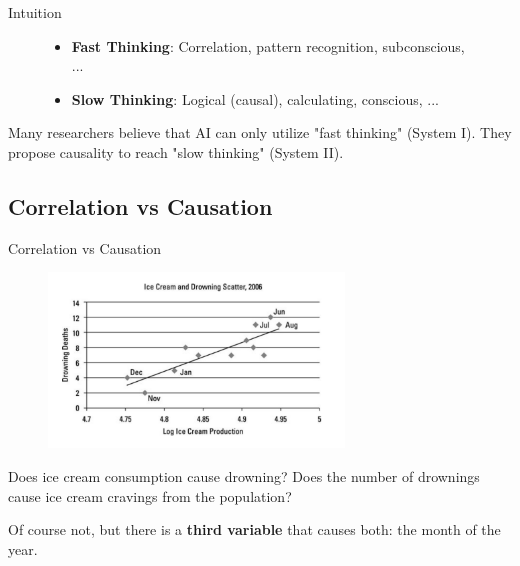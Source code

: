 \begin{frame}{Intuition}
\begin{figure}
        \hspace{0.5cm}
        \begin{minipage}[t]{0.5\linewidth}
            \vspace{1cm}
            \begin{itemize}
                \item \textbf{Fast Thinking}: Correlation, pattern recognition, subconscious, ...
                \item \textbf{Slow Thinking}: Logical (causal), calculating, conscious, ...
            \end{itemize}
        \end{minipage}
    \end{figure}
    Many researchers believe that AI can only utilize "fast thinking" (System I). They propose causality to reach "slow thinking" (System II).
\end{frame}
\subsection{Correlation vs Causation}

\begin{frame}{Correlation vs Causation}
    \begin{figure}[t]
        \centering
        \vspace{0pt}
        \includegraphics[width=0.7\textwidth]{img/hidden_con.png}
    \end{figure}
    \small{Does ice cream consumption cause drowning? Does the number of drownings cause ice cream cravings from the population?}
    
    \pause
    Of course not, but there is a \textbf{third variable} that causes both: the month of the year. 
\end{frame}
